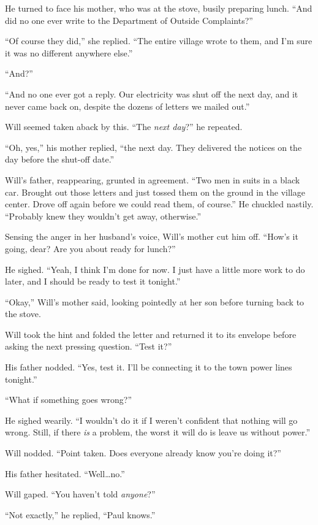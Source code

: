 \documentclass[12pt,letterpaper,oneside,english]{book}
\begin{document}
He turned to face his mother, who was at the stove, busily preparing
lunch. ``And did no one ever write to the Department of Outside
Complaints?''

``Of course they did,'' she replied. ``The entire village wrote to them,
and I'm sure it was no different anywhere else.''

``And?''

``And no one ever got a reply. Our electricity was shut off the next
day, and it never came back on, despite the dozens of letters we mailed
out.''

Will seemed taken aback by this. ``The \emph{next day}?'' he repeated.

``Oh, yes,'' his mother replied, ``the next day. They delivered the
notices on the day before the shut-off date.''

Will's father, reappearing, grunted in agreement.  ``Two men in suits in
a black car. Brought out those letters and just tossed them on the
ground in the village center. Drove off again before we could read them,
of course.'' He chuckled nastily. ``Probably knew they wouldn't get
away, otherwise.''

Sensing the anger in her husband's voice, Will's mother cut him off.
``How's it going, dear? Are you about ready for lunch?''

He sighed. ``Yeah, I think I'm done for now. I just have a little more
work to do later, and I should be ready to test it tonight.''

``Okay,'' Will's mother said, looking pointedly at her son before
turning back to the stove.

Will took the hint and folded the letter and returned it to its
envelope before asking the next pressing question. ``Test it?''

His father nodded. ``Yes, test it. I'll be connecting it to the town
power lines tonight.''

``What if something goes wrong?''

He sighed wearily. ``I wouldn't do it if I weren't confident that
nothing will go wrong. Still, if there \emph{is} a problem, the worst it
will do is leave us without power.''

Will nodded. ``Point taken. Does everyone already know you're doing it?''

His father hesitated. ``Well\ldots{}no.''

Will gaped. ``You haven't told \emph{anyone}?''

``Not exactly,'' he replied, ``Paul knows.''
\end{document}
